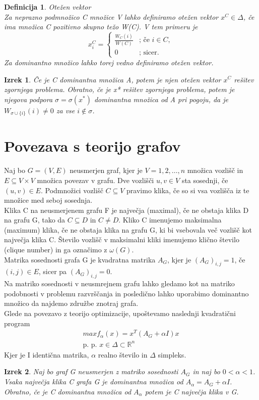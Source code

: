 \documentclass[a4paper]{article}
\newtheorem{definition}{Definicija}[section]
\newtheorem{theorem}{Izrek}
\begin{document}
\begin{definition}{Otežen vektor} \\
Za neprazno podmnožico C množice V lahko definiramo otežen vektor $x^C\in\Delta$, če ima množica C pozitivno skupno težo W(C). V tem primeru je
$$x^C_i=\begin{cases}
\frac{W_C(i)}{W(C)}& \text{; če $i \in C$},\\
0& \text{; sicer}.
\end{cases}$$
Za dominantno množico lahko torej vedno definiramo otežen vektor.
\end{definition}
\begin{theorem}
Če je C dominantna množica A, potem je njen otežen vektor $x^C$ rešitev zgornjega problema. Obratno, če je x* rešitev zgornjega problema, potem je njegova podpora $\sigma = \sigma(x^*)$ dominantna množica od A pri pogoju, da je $W_{\sigma\cup\{i\}}(i) \not= 0$ za vse $i \notin \sigma$.
\end{theorem}

\section{Povezava s teorijo grafov}
Naj bo $G=(V,E)$ neusmerjen graf, kjer je $V={1,2,\ldots,n}$ množica vozlišč in $E\subseteq V\times V$ množica povezav v grafu. Dve vozlišči $u, v \in V$ sta sosednji, če $(u, v) \in E$. Podmnožici vozlišč $C \subseteq V$ pravimo klika, če so si vsa vozlišča iz te množice med seboj sosednja.\\
Klika C na neusmerjenem grafu F je največja (maximal), če ne obstaja klika D na grafu G, tako da $C \subseteq D$ in $C \not= D$. Kliko C imenujemo maksimalna (maximum) klika, če ne obstaja klika na grafu G, ki bi vsebovala več vozlišč kot največja klika C. Število vozlišč v maksimalni kliki imenujemo klično število (clique number) in ga označimo z $\omega(G)$. \\
Matrika sosednosti grafa G je kvadratna matrika $A_G$, kjer je $(A_G)_{i,j}=1$, če $(i,j)\in E$, sicer pa $(A_G)_{i,j}=0$.\\
Na matriko sosednosti v neusmrejnem grafu lahko gledamo kot na matriko podobnosti v problemu razvrščanja in posledično lahko uporabimo dominantno množico da najdemo združbe znotraj grafa.\\
Glede na povezavo z teorijo optimizacije, upoštevamo naslednji kvadratični program
\begin{gather}
max f_\alpha(x) = x^T(A_G + \alpha I)x \\
\text{p. p. } x\in\Delta \subset \mathbb{R}^n
\end{gather}
Kjer je I identična matrika, $\alpha$ realno število in $\Delta$ simpleks.
\begin{theorem}
Naj bo graf G neusmerjen z matriko sosednosti $A_G$ in naj bo $0 < \alpha < 1$. Vsaka največja klika C grafa G je dominantna množica od $A_\alpha = A_G + \alpha I$. Obratno, če je C dominantna množica od $A_\alpha$ potem je C največja klika v G.
\end{theorem}
\end{document}
